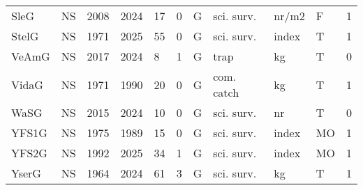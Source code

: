 \begin{table}[ht]
\begin{tabular}{p{1cm}p{1cm}p{1cm}p{1cm}p{0.8cm}p{0.8cm}p{1cm}p{2cm}p{2cm}p{1cm}p{1cm}}
  SleG & NS & 2008 & 2024 & 17 & 0 & G & sci. surv. & nr/m2 & F & 1 \\ 
  StelG & NS & 1971 & 2025 & 55 & 0 & G & sci. surv. & index & T & 1 \\ 
  VeAmG & NS & 2017 & 2024 & 8 & 1 & G & trap & kg & T & 0 \\ 
  VidaG & NS & 1971 & 1990 & 20 & 0 & G & com. catch & kg & T & 1 \\ 
  WaSG & NS & 2015 & 2024 & 10 & 0 & G & sci. surv. & nr & T & 0 \\ 
  YFS1G & NS & 1975 & 1989 & 15 & 0 & G & sci. surv. & index & MO & 1 \\ 
  YFS2G & NS & 1992 & 2025 & 34 & 1 & G & sci. surv. & index & MO & 1 \\ 
  YserG & NS & 1964 & 2024 & 61 & 3 & G & sci. surv. & kg & T & 1 \\ 
   \hline
\end{tabular}
\end{table}
